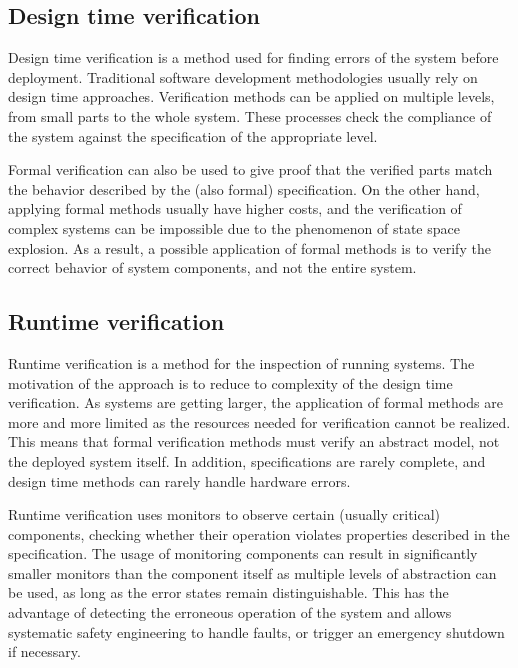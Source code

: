 \subsection{Design time verification}

Design time verification is a method used for finding errors of the system before deployment. Traditional software development methodologies usually rely on design time approaches. Verification methods can be applied on multiple levels, from small parts to the whole system. These processes check the compliance of the system against the specification of the appropriate level.%

Formal verification can also be used to give proof that the verified parts match the behavior described by the (also formal) specification. On the other hand, applying formal methods usually have higher costs, and the verification of complex systems can be impossible due to the phenomenon of state space explosion. As a result, a possible application of formal methods is to verify the correct behavior of system components, and not the entire system.

\subsection{Runtime verification}

Runtime verification is a method for the inspection of running systems. The motivation of the approach
is to reduce to complexity of the design time verification. 
As systems are getting larger, the application of formal methods are more and more limited as the resources needed for verification cannot be realized. This means that formal verification methods must verify an abstract model, not the deployed system itself. In addition, specifications are rarely complete, and design time methods can rarely handle hardware errors. %

Runtime verification uses monitors to observe certain (usually critical) components, checking whether their operation violates properties described in the specification. The usage of monitoring components can result in significantly smaller monitors than the component itself as multiple levels of abstraction can be used, as long as the error states remain distinguishable. This has the advantage of detecting the erroneous operation of the system and allows systematic safety engineering to handle faults, or trigger an emergency shutdown if necessary.

